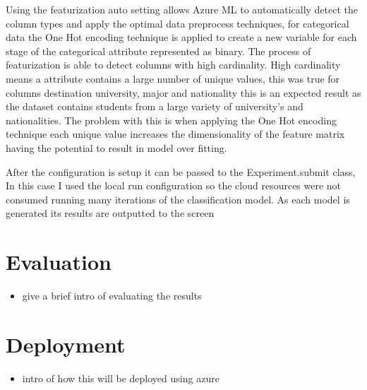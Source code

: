 Using the featurization auto setting allows Azure ML to automatically detect the column types and apply the optimal data preprocess techniques, for categorical data the One Hot encoding technique is applied to create a new variable for each stage of the categorical attribute represented as binary. The process of featurization is able to detect columns with high cardinality.  High cardinality means a attribute contains a large number of unique values, this was true for columns destination university, major and nationality this is an expected result as the dataset contains students from a large variety of university's and nationalities. The problem with this is when applying the One Hot encoding technique each unique value increases the dimensionality of the feature matrix having the potential to result in model over fitting.

After the configuration is setup it can be passed to the Experiment.submit class, In this case I used the local run configuration so the cloud resources were not consumed running many iterations of the classification model. As each model is generated its results are outputted to the screen

\section{Evaluation}

\begin{itemize}
\item give a brief intro of evaluating the results
\end{itemize}


\section{Deployment}

\begin{itemize}
\item intro of how this will be deployed using azure
\end{itemize}



